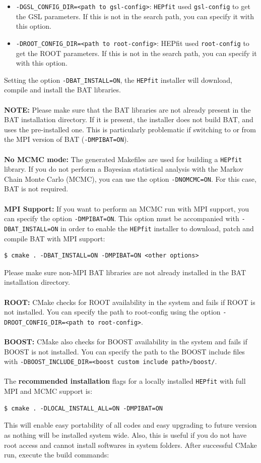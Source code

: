 \documentclass[preprint,3p,12pt]{elsarticle}
\newcommand{\HEPfit}{\texttt{HEPfit}\xspace}
\begin{document}
{\begin{itemize}
\item \texttt{-DGSL\_CONFIG\_DIR=<path to gsl-config>}: \HEPfit used \texttt{gsl-config} to get the GSL parameters. If this is not in the search path, you can specify it with this option. 

\item \texttt{-DROOT\_CONFIG\_DIR=<path to root-config>}: HEPfit used \texttt{root-config} to get the ROOT parameters. If this is not in the search path, you can specify it with this option. 
\end{itemize}
Setting the option \texttt{-DBAT\_INSTALL=ON}, the \HEPfit installer will download, 
compile and install the BAT libraries.\\\\
%
{\bf NOTE:}
Please make sure that the BAT libraries are not already present in the
BAT installation directory. If it is present, the installer does not
build BAT, and uses the pre-installed one. This is particularly problematic
if switching to or from the MPI version of BAT (\texttt{-DMPIBAT=ON}).\\\\
%
{\bf No MCMC mode:}
The generated Makefiles are used for building a \HEPfit library. If
you do not perform a Bayesian statistical analysis with the Markov
Chain Monte Carlo (MCMC), you can use the option \texttt{-DNOMCMC=ON}. For
this case, BAT is not required. \\\\
%
{\bf MPI Support:}
If you want to perform an MCMC run with MPI support, you can specify
the option \texttt{-DMPIBAT=ON}. This option must be accompanied with
\texttt{-DBAT\_INSTALL=ON} in order to enable the \HEPfit installer to
download, patch and compile BAT with MPI support:
\begin{lstlisting} 
$ cmake . -DBAT_INSTALL=ON -DMPIBAT=ON <other options>  
\end{lstlisting}
Please make sure non-MPI BAT libraries are not already installed in the 
BAT installation directory.\\\\
%
{\bf ROOT:}
CMake checks for ROOT availability in the system and fails if ROOT is
not installed. You can specify the path to root-config using the
option \texttt{-DROOT\_CONFIG\_DIR=<path to root-config>}. \\\\
%
{\bf BOOST:}
CMake also checks for BOOST availability in the system and fails if
BOOST is not installed. You can specify the path to the BOOST include
files with \texttt{-DBOOST\_INCLUDE\_DIR=<boost custom include path>/boost/}. \\\\
%
The {\bf recommended installation} flags for a locally installed \HEPfit with full MPI and MCMC support is:
\begin{lstlisting} 
$ cmake . -DLOCAL_INSTALL_ALL=ON -DMPIBAT=ON
\end{lstlisting}
This will enable easy portability of all codes and easy upgrading to future version as nothing will be installed system wide.  Also, this is useful if you do not have root access and cannot install softwares in system folders. After successful CMake run, execute the build commands:

}
\end{document}
